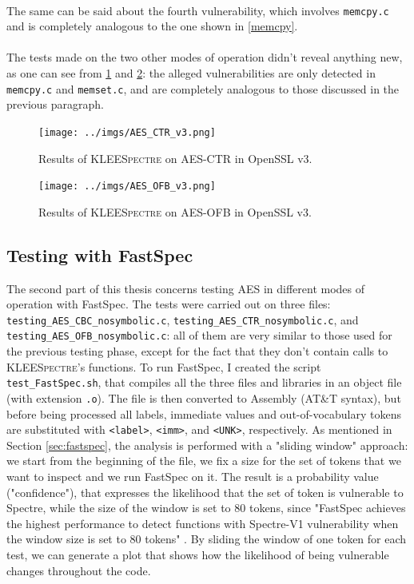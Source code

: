 \documentclass[12pt,a4paper]{book}
\theoremstyle{definition}
\begin{document}
	\paragraph{} The same can be said about the fourth vulnerability, which involves \texttt{memcpy.c} and is completely analogous to the one shown in \ref{memcpy}.
	
	\paragraph{} The tests made on the two other modes of operation didn't reveal anything new, as one can see from \ref{fig:result_ctr_v3} and \ref{fig:result_ofb_v3}: the alleged vulnerabilities are only detected in \texttt{memcpy.c} and \texttt{memset.c}, and are completely analogous to those discussed in the previous paragraph.

	\begin{figure}[!ht]
		\centering
		\texttt{[image: ../imgs/AES\_CTR\_v3.png]}
		\captionsetup{width=.8\linewidth}
		\caption{Results of \textsc{KLEESpectre} on AES-CTR in OpenSSL v3.}
		\label{fig:result_ctr_v3}
	\end{figure}

	\begin{figure}[!ht]
		\centering
		\texttt{[image: ../imgs/AES\_OFB\_v3.png]}
		\captionsetup{width=.8\linewidth}
		\caption{Results of \textsc{KLEESpectre} on AES-OFB in OpenSSL v3.}
		\label{fig:result_ofb_v3}
	\end{figure}

	\subsection{Testing with FastSpec}
	The second part of this thesis concerns testing AES in different modes of operation with FastSpec. The tests were carried out on three files: \texttt{testing\_AES\_CBC\_nosymbolic.c}, \texttt{testing\_AES\_CTR\_nosymbolic.c}, and \texttt{testing\_AES\_OFB\_nosymbolic.c}: all of them are very similar to those used for the previous testing phase, except for the fact that they don't contain calls to \textsc{KLEESpectre}'s functions. To run FastSpec, I created the script \texttt{test\_FastSpec.sh}, that compiles all the three files and libraries in an object file (with extension \texttt{.o}). The file is then converted to Assembly (AT\&T syntax), but before being processed all labels, immediate values and out-of-vocabulary tokens are substituted with 
	\texttt{<label>}, \texttt{<imm>}, and \texttt{<UNK>}, respectively. As mentioned in Section \ref{sec:fastspec}, the analysis is performed with a "sliding window" approach: we start from the beginning of the file, we fix a size for the set of tokens that we want to inspect and we run FastSpec on it. The result is a probability value ("confidence"), that expresses the likelihood that the set of token is vulnerable to Spectre, while the size of the window is set to 80 tokens, since "FastSpec achieves the highest performance to detect functions with Spectre-V1 vulnerability when the window size is set to 80 tokens" \cite{Tol2021}. By sliding the window of one token for each test, we can generate a plot that shows how the likelihood of being vulnerable changes throughout the code. 
	
\end{document}
